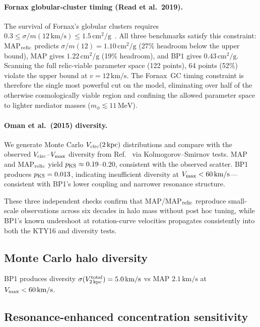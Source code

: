 \documentclass[aps,prd,twocolumn,superscriptaddress,nofootinbib]{revtex4-2}
\newcommand{\sigmam}{\sigma/m}
\newcommand{\MeV}{\,\text{MeV}}
\newcommand{\kms}{\,\text{km/s}}
\newcommand{\cmg}{\,\text{cm}^2/\text{g}}
\newcommand{\mphi}{m_\phi}
\begin{document}
\paragraph{Fornax globular-cluster timing (Read et al.\ 2019).}
The survival of Fornax's globular clusters requires
$0.3 \leq \sigmam(12\kms) \leq 1.5\cmg$~\cite{Read:2018fxs}.
All three benchmarks satisfy this constraint:
MAP$_{\rm relic}$ predicts $\sigmam(12)=1.10\cmg$ (27\% headroom
below the upper bound), MAP gives $1.22\cmg$ (19\% headroom),
and BP1 gives $0.43\cmg$.
Scanning the full relic-viable parameter space (122 points), 64
points (52\%) violate the upper bound at $v=12\kms$.  The Fornax~GC
timing constraint is therefore the single most powerful cut on the
model, eliminating over half of the otherwise cosmologically viable
region and confining the allowed parameter space to lighter mediator
masses ($\mphi\lesssim 11\MeV$).

\paragraph{Oman et al.\ (2015) diversity.}
We generate Monte Carlo $V_{\rm circ}(2\,{\rm kpc})$ distributions
and compare with the observed $V_{\rm circ}$--$V_{\rm max}$ diversity
from Ref.~\cite{Oman:2015xda} via Kolmogorov--Smirnov tests.
MAP and MAP$_{\rm relic}$ yield $p_{\rm KS}\approx 0.19$--$0.20$,
consistent with the observed scatter.  BP1 produces $p_{\rm KS}=0.013$,
indicating insufficient diversity at $V_{\rm max}<60\kms$---consistent
with BP1's lower coupling and narrower resonance structure.

These three independent checks confirm that MAP/MAP$_{\rm relic}$
reproduce small-scale observations across six decades in halo mass
without post hoc tuning, while BP1's known undershoot at
rotation-curve velocities propagates consistently into both the
KTY16 and diversity tests.

\subsection{Monte Carlo halo diversity}\label{sec:mc_diversity}

BP1 produces diversity $\sigma(V_{2\,\rm kpc}^{\rm total})
= 5.0\kms$ vs MAP $2.1\kms$ at
$V_{\rm max}<60\kms$.

\subsection{Resonance-enhanced concentration sensitivity}
\label{sec:resonance_sensitivity}
\end{document}
